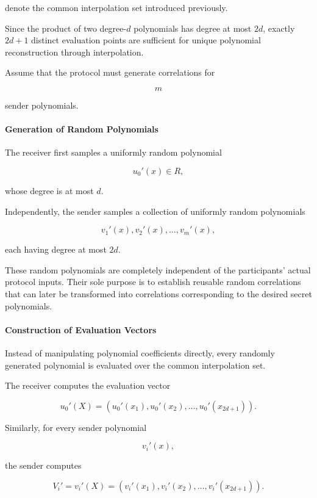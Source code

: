 \documentclass[11pt,a4paper]{article}
\begin{document}
denote the common interpolation set introduced previously.

Since the product of two degree-$d$ polynomials has degree at most $2d$, exactly $2d+1$ distinct
evaluation points are sufficient for unique polynomial reconstruction through interpolation.

Assume that the protocol must generate correlations for

\[
m
\]

sender polynomials.

 

\paragraph{Generation of Random Polynomials}

The receiver first samples a uniformly random polynomial

\[
u_0'(x)\in R,
\]

whose degree is at most $d$.

Independently, the sender samples a collection of uniformly random polynomials

\[
v_1'(x),
v_2'(x),
\ldots,
v_m'(x),
\]

each having degree at most $2d$.

These random polynomials are completely independent of the participants' actual protocol inputs. Their
sole purpose is to establish reusable random correlations that can later be transformed into correlations
corresponding to the desired secret polynomials.

 

\paragraph{Construction of Evaluation Vectors}

Instead of manipulating polynomial coefficients directly, every randomly generated polynomial is evaluated
over the common interpolation set.

The receiver computes the evaluation vector

\[
u_0'(X)
=
\left(
u_0'(x_1),
u_0'(x_2),
\ldots,
u_0'(x_{2d+1})
\right).
\]

Similarly, for every sender polynomial

\[
v_i'(x),
\]

the sender computes

\[
V_i'
=
v_i'(X)
=
\left(
v_i'(x_1),
v_i'(x_2),
\ldots,
v_i'(x_{2d+1})
\right).
\]
\end{document}
